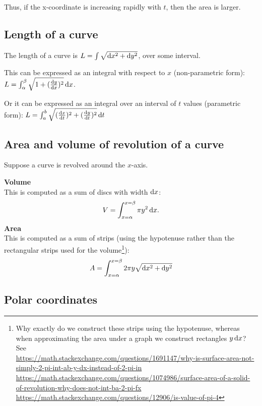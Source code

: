 Thus, if the x-coordinate is increasing rapidly with $t$, then the area is
larger.

\subsection{Length of a curve}

The length of a curve is $L = \int \sqrt{\dx^2 + \dy^2}$, over some interval.

This can be expressed as an integral with respect to $x$ (non-parametric form):
$L = \int_\alpha^\beta \sqrt{1 + (\frac{\dy}{\dx})^2} \dx$.

Or it can be expressed as an integral over an interval of $t$ values (parametric form):
$L = \int_a^b \sqrt{ (\frac{\dx}{\dt})^2 + (\frac{\dy}{\dt})^2} \dt$

\subsection{Area and volume of revolution of a curve}
Suppose a curve is revolved around the $x$-axis.

\textbf{Volume}\\
This is computed as a sum of discs with width $\dx$:
\begin{align*}
  V = \int_{x=\alpha}^{x=\beta} \pi y^2 \dx.
\end{align*}
\textbf{Area}\\
This is computed as a sum of strips (using the hypotenuse rather than the rectangular strips used for the volume\footnote{Why exactly do we
  construct these strips using the hypotenuse, whereas when approximating the
  area under a graph we construct rectangles $y\dx$? See \\
  \url{https://math.stackexchange.com/questions/1691147/why-is-surface-area-not-simply-2-pi-int-ab-y-dx-instead-of-2-pi-in}\\
  \url{https://math.stackexchange.com/questions/1074986/surface-area-of-a-solid-of-revolution-why-does-not-int-ba-2-pi-fx}\\
  \url{https://math.stackexchange.com/questions/12906/is-value-of-pi-4}}):
\begin{align*}
  A = \int_{x=\alpha}^{x=\beta}  2\pi y \sqrt{\dx^2 + \dy^2}
\end{align*}


\subsection{Polar coordinates}

